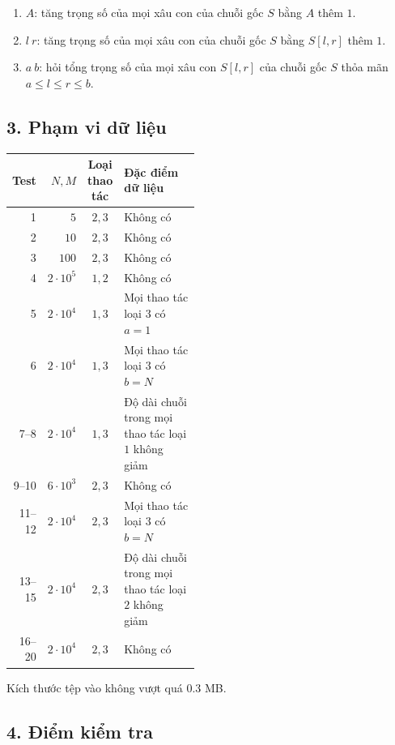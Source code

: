 \documentclass[11pt]{article}
\begin{document}
\begin{enumerate}
  \item \(A\): tăng trọng số của mọi xâu con của chuỗi gốc \(S\) bằng \(A\)
  thêm \(1\).
  \item \(l\ r\): tăng trọng số của mọi xâu con của chuỗi gốc \(S\) bằng
  \(S[l,r]\) thêm \(1\).
  \item \(a\ b\): hỏi tổng trọng số của mọi xâu con \(S[l,r]\) của chuỗi gốc
  \(S\) thỏa mãn \(a\le l\le r\le b\).
\end{enumerate}

\subsection*{3. Phạm vi dữ liệu}

\begin{center}
\small
\begin{tabular}{r r c >{\raggedright\arraybackslash}p{0.46\linewidth}}
\textbf{Test} & \textbf{\(N,M\)} & \textbf{Loại thao tác} & \textbf{Đặc điểm dữ liệu} \\
\hline
1 & \(5\) & \(2,3\) & Không có \\
2 & \(10\) & \(2,3\) & Không có \\
3 & \(100\) & \(2,3\) & Không có \\
4 & \(2\cdot10^5\) & \(1,2\) & Không có \\
5 & \(2\cdot10^4\) & \(1,3\) & Mọi thao tác loại \(3\) có \(a=1\) \\
6 & \(2\cdot10^4\) & \(1,3\) & Mọi thao tác loại \(3\) có \(b=N\) \\
7--8 & \(2\cdot10^4\) & \(1,3\) & Độ dài chuỗi trong mọi thao tác loại \(1\) không giảm \\
9--10 & \(6\cdot10^3\) & \(2,3\) & Không có \\
11--12 & \(2\cdot10^4\) & \(2,3\) & Mọi thao tác loại \(3\) có \(b=N\) \\
13--15 & \(2\cdot10^4\) & \(2,3\) & Độ dài chuỗi trong mọi thao tác loại \(2\) không giảm \\
16--20 & \(2\cdot10^4\) & \(2,3\) & Không có
\end{tabular}
\end{center}

Kích thước tệp vào không vượt quá \(0.3\) MB.

\subsection*{4. Điểm kiểm tra}
\end{document}

